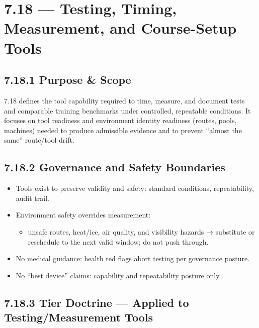 \documentclass[10pt]{article}
\begin{document}
\section*{7.18 — Testing, Timing, Measurement, and Course-Setup Tools}
{}

\subsection*{7.18.1 Purpose \& Scope}
{}

7.18 defines the tool capability required to time, measure, and document tests and comparable training benchmarks under controlled, repeatable conditions. It focuses on tool readiness and environment identity readiness (routes, pools, machines) needed to produce admissible evidence and to prevent “almost the same” route/tool drift.

\subsection*{7.18.2 Governance and Safety Boundaries}
{}

\begin{itemize}
\item Tools exist to preserve validity and safety: standard conditions, repeatability, audit trail.
\item Environment safety overrides measurement:
  \begin{itemize}
  \item unsafe routes, heat/ice, air quality, and visibility hazards → substitute or reschedule to the next valid window; do not push through.
  \end{itemize}
\item No medical guidance: health red flags abort testing per governance posture.
\item No “best device” claims: capability and repeatability posture only.
\end{itemize}

\subsection*{7.18.3 Tier Doctrine — Applied to Testing/Measurement Tools}
{}
\end{document}
